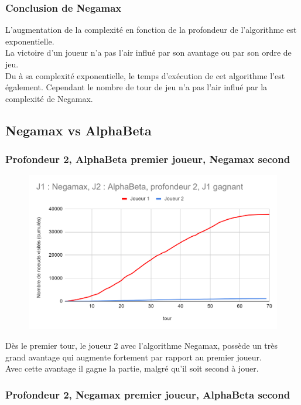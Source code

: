 \documentclass[12pt]{article}
\begin{document}
\subsubsection{Conclusion de Negamax}

L’augmentation de la complexité en fonction de la profondeur de l’algorithme est exponentielle.\\
La victoire d’un joueur n’a pas l’air influé par son avantage ou par son ordre de jeu.\\
Du à sa complexité exponentielle, le temps d’exécution de cet algorithme l’est également.
Cependant le nombre de tour de jeu n'a pas l'air influé par la complexité de Negamax.

\subsection{Negamax vs AlphaBeta}

\subsubsection{Profondeur 2, AlphaBeta premier joueur, Negamax second}

\begin{figure}[!h]
   \includegraphics[width=\textwidth]{prof2alphaVSnegamax.png}
\end{figure}

Dès le premier tour, le joueur 2 avec l'algorithme Negamax, possède un très grand avantage qui augmente fortement par rapport au premier joueur.\\
Avec cette avantage il gagne la partie, malgré qu'il soit second à jouer.

\subsubsection{Profondeur 2, Negamax premier joueur, AlphaBeta second}
\end{document}
